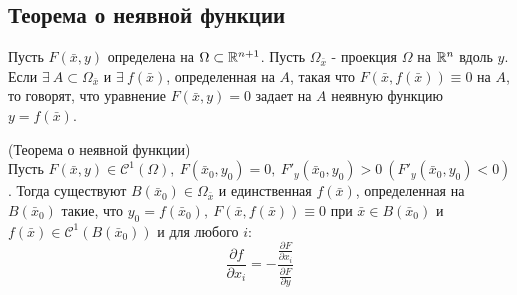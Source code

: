 \subsection{Теорема о неявной функции}
\begin{definition}%
    Пусть $F(\bar{x},y)$ определена на $\Omega\subset \mathbb{R}^{n+1}$. Пусть $\Omega_{\bar{x}}$ - проекция $\Omega$ на $\mathbb{R}^n$ вдоль $y$. Если $\exists\ A\subset \Omega_{\bar{x}}$ и $\exists\ f(\bar{x})$, определенная на $A$, такая что $F(\bar{x}, f(\bar{x}))\equiv 0$ на $A$, то говорят, что уравнение $F(\bar{x}, y)=0$ задает на $A$ неявную функцию $y=f(\bar{x})$.
\end{definition} 
\begin{theorem} (Теорема о неявной функции)\\
    Пусть $F(\bar{x},y)\in \mathcal{C}^1(\Omega),\ F(\bar{x}_0,y_0)=0,\ F'_y(\bar{x}_0,y_0)>0\ (F'_y(\bar{x}_0,y_0)<0)$. Тогда существуют $B(\bar{x}_0)\in \Omega_{\bar{x}}$ и единственная $f(\bar{x})$, определенная на $B(\bar{x}_0)$ такие, что $y_0=f(\bar{x}_0),\ F(\bar{x},f(\bar{x}))\equiv 0$ при $\bar{x}\in B(\bar{x}_0)$ и $f(\bar{x})\in \mathcal{C}^1(B(\bar{x}_0))$ и для любого $i$:
    \[\frac{\partial {f}}{\partial {x_i}}=-\frac{\frac{\partial {F}}{\partial {x_i}}}{\frac{\partial {F}}{\partial {y}}}\]
\end{theorem} 
